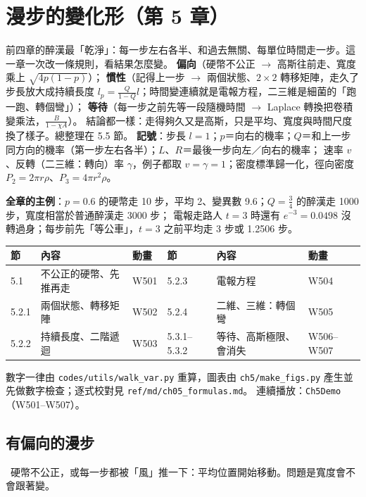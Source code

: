 

\section{漫步的變化形（第 5 章）}

\begin{keybox}[先看這裡]
前四章的醉漢最「乾淨」：每一步左右各半、和過去無關、每單位時間走一步。這一章一次改一條規則，看結果怎麼變。
\textbf{偏向}（硬幣不公正 $\to$ 高斯往前走、寬度乘上 $\sqrt{4p(1-p)}$）；
\textbf{慣性}（記得上一步 $\to$ 兩個狀態、$2\times2$ 轉移矩陣，走久了步長放大成持續長度 $l_p=\frac{Q}{1-Q}l$；時間變連續就是電報方程，二三維是細菌的「跑一跑、轉個彎」）；
\textbf{等待}（每一步之前先等一段隨機時間 $\to$ Laplace 轉換把卷積變乘法，$\frac{B}{1-\chi A}$）。
結論都一樣：走得夠久又是高斯，只是平均、寬度與時間尺度換了樣子。總整理在 5.5 節。
\textbf{記號}：步長 $l=1$；$p$＝向右的機率；$Q$＝和上一步同方向的機率（第一步左右各半）；$L$、$R$＝最後一步向左／向右的機率；
速率 $v$、反轉（二三維：轉向）率 $\gamma$，例子都取 $v=\gamma=1$；密度標準歸一化，徑向密度 $P_2=2\pi r\rho$、$P_3=4\pi r^2\rho$。

\textbf{全章的主例}：$p=0.6$ 的硬幣走 10 步，平均 2、變異數 9.6；$Q=\frac34$ 的醉漢走 1000 步，寬度相當於普通醉漢走 3000 步；
電報走路人 $t=3$ 時還有 $e^{-3}=0.0498$ 沒轉過身；每步前先「等公車」，$t=3$ 之前平均走 3 步或 1.2506 步。
\begin{center}
\small
\begin{tabular}{@{}lll@{\qquad}lll@{}}
\toprule
節 & 內容 & 動畫 & 節 & 內容 & 動畫\\
\midrule
5.1 & 不公正的硬幣、先推再走 & W501 & 5.2.3 & 電報方程 & W504\\
5.2.1 & 兩個狀態、轉移矩陣 & W502 & 5.2.4 & 二維、三維：轉個彎 & W505\\
5.2.2 & 持續長度、二階遞迴 & W503 & 5.3.1--5.3.2 & 等待、高斯極限、會消失 & W506--W507\\
\bottomrule
\end{tabular}
\end{center}
數字一律由 \texttt{codes/utils/walk\_var.py} 重算，圖表由 \texttt{ch5/make\_figs.py} 產生並先做數字檢查；逐式校對見 \texttt{ref/md/ch05\_formulas.md}。
連續播放：\texttt{Ch5Demo}（W501--W507）。
\end{keybox}

\subsection{有偏向的漫步}
\leavevmode{}\ \quad 硬幣不公正，或每一步都被「風」推一下：平均位置開始移動。問題是寬度會不會跟著變。

